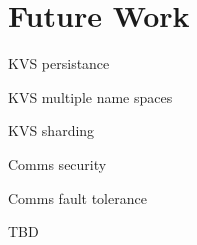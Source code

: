 \section{Future Work}

KVS persistance

KVS multiple name spaces

KVS sharding

Comms security

Comms fault tolerance

TBD
